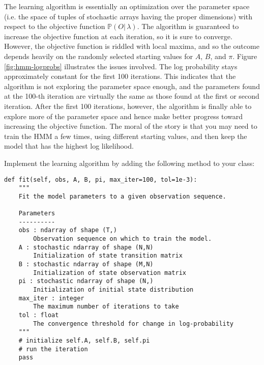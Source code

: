 The learning algorithm is essentially an optimization over the parameter space (i.e. the space of tuples of
stochastic arrays having the proper dimensions) with respect to the objective function $\mathbb{P}(O |\, \lambda)$.
The algorithm is guaranteed to increase the objective function at each iteration, so it is sure to converge.
However, the objective function is riddled with local maxima, and so the outcome depends heavily on the randomly
selected starting values for $A$, $B$, and $\pi$. Figure \ref{fig:hmm-logprobs} illustrates the issues involved.
The log probability stays approximately constant for the first 100
iterations. This indicates that the algorithm is not exploring the parameter space enough, and the parameters
found at the 100-th iteration are virtually the same as those found at the first or second iteration. After the first
100 iterations, however, the algorithm is finally able to explore more of the parameter space and hence make
better progress toward increasing the objective function. The moral of the story is that you may need to train
the HMM a few times, using different starting values, and then keep the model that has the highest log likelihood.


\begin{problem}
Implement the learning algorithm by adding the following method to your class:
\begin{lstlisting}
def fit(self, obs, A, B, pi, max_iter=100, tol=1e-3):
    """
    Fit the model parameters to a given observation sequence.

    Parameters
    ----------
    obs : ndarray of shape (T,)
        Observation sequence on which to train the model.
    A : stochastic ndarray of shape (N,N)
        Initialization of state transition matrix
    B : stochastic ndarray of shape (M,N)
        Initialization of state observation matrix
    pi : stochastic ndarray of shape (N,)
        Initialization of initial state distribution
    max_iter : integer
        The maximum number of iterations to take
    tol : float
        The convergence threshold for change in log-probability
    """
    # initialize self.A, self.B, self.pi
    # run the iteration
    pass
\end{lstlisting}
\end{problem}

